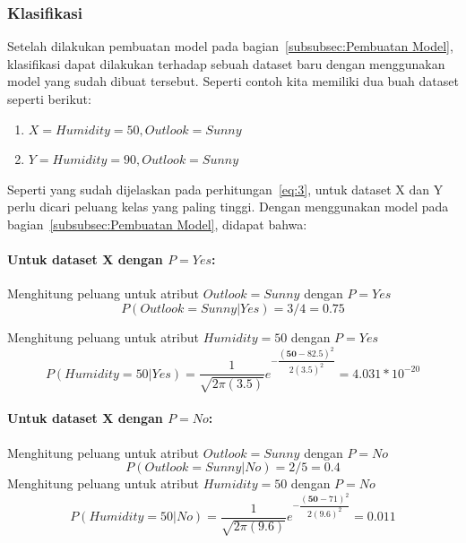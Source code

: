 \subsubsection{Klasifikasi}
\label{subsubsec:Klasifikasi}

Setelah dilakukan pembuatan model pada bagian~\ref{subsubsec:Pembuatan Model}, klasifikasi dapat dilakukan terhadap sebuah dataset baru dengan menggunakan model yang sudah dibuat tersebut. Seperti contoh kita memiliki dua buah dataset seperti berikut:
\begin{enumerate}
	\item $X = {Humidity = 50, Outlook = Sunny}$
	\item $Y = {Humidity = 90, Outlook = Sunny}$
\end{enumerate}

Seperti yang sudah dijelaskan pada perhitungan~\ref{eq:3}, untuk dataset X dan Y perlu dicari peluang kelas yang paling tinggi. Dengan menggunakan model pada bagian~\ref{subsubsec:Pembuatan Model}, didapat bahwa:
\paragraph{Untuk dataset X dengan $P=Yes$:}
	Menghitung peluang untuk atribut $Outlook=Sunny$ dengan $P=Yes$
	\begin{equation}
			P(Outlook=Sunny|Yes) = 3/4 
			= 0.75
	\end{equation}
	
	Menghitung peluang untuk atribut $Humidity=50$ dengan $P=Yes$
		\begin{equation}
			P(Humidity=50|Yes) 
			= \dfrac{1}{\sqrt{2\pi(3.5)}}e^{-\dfrac{(\textbf{50}-82.5)^2}{2(3.5)^2}}
			= 4.031*10^{-20}
		\end{equation}
	
	\paragraph{Untuk dataset X dengan $P=No$:}
		Menghitung peluang untuk atribut $Outlook=Sunny$ dengan $P=No$
		\begin{equation}
			P(Outlook=Sunny|No) = 2/5 
			= 0.4
		\end{equation}
		Menghitung peluang untuk atribut $Humidity=50$ dengan $P=No$
		\begin{equation}
			P(Humidity=50|No) 
			= \dfrac{1}{\sqrt{2\pi(9.6)}}e^{-\dfrac{(\textbf{50}-71)^2}{2(9.6)^2}}
			= 0.011
		\end{equation}

